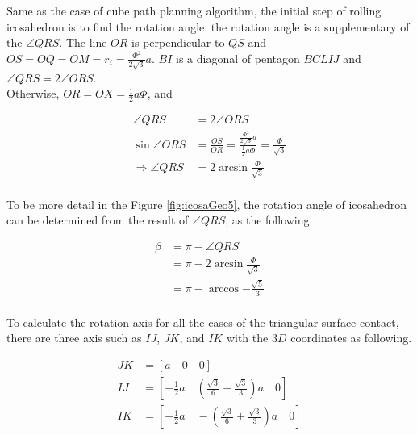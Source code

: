 \noindent Same as the case of cube path planning algorithm, the initial step of rolling icosahedron is to find the rotation angle. the rotation angle is a supplementary of the $\angle{QRS}$. The line $OR$ is perpendicular to $QS$ and $OS = OQ = OM = r_i = \frac{\Phi^2}{2\sqrt{3}}a$. $BI$ is a diagonal of pentagon $BCLIJ$ and $\angle{QRS}=2\angle{ORS}$.\\

\noindent Otherwise, $OR=OX=\frac{1}{2}a\Phi$, and

\begin{equation*} 
\label{icosa:eq2}
\begin{split}
\angle{QRS} & = 2\angle{ORS}\\
\sin{\angle{ORS}} & = \frac{OS}{OR} = \frac{ \frac{\Phi^2}{2\sqrt{3}}a}{\frac{1}{2}a\Phi} = \frac{\Phi}{\sqrt{3}}\\
\Rightarrow \angle{QRS} & =2\arcsin{\frac{\Phi}{\sqrt{3}}}\\
\end{split}
\end{equation*}

\noindent To be more detail in the Figure \ref{fig:icosaGeo5}, the rotation angle of icosahedron can be determined from the result of $\angle{QRS}$, as the following. 

\begin{equation*} 
\label{icosa:eq3}
\begin{split}
\beta & = \pi- \angle{QRS}\\
      & = \pi - 2\arcsin{\frac{\Phi}{\sqrt{3}}}\\
      & = \pi- \arccos{-\frac{\sqrt{5}}{3}}\\
\end{split}
\end{equation*}

\noindent To calculate the rotation axis for all the cases of the triangular surface contact, there are three axis such as $IJ$, $JK$, and $IK$ with the $3D$ coordinates as following.

\begin{align*}
\label{icosa:eq4}
JK & = [a\quad  0\quad  0]\\
IJ & = [-\frac{1}{2}a\quad  (\frac{\sqrt{3}}{6}+\frac{\sqrt{3}}{3})a\quad  0]\\
IK & = [-\frac{1}{2}a\quad  -(\frac{\sqrt{3}}{6}+\frac{\sqrt{3}}{3})a\quad  0]
\end{align*}

